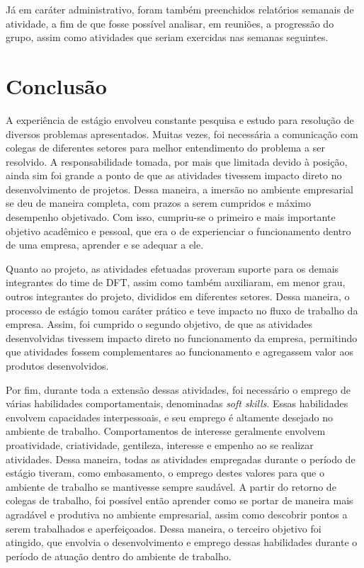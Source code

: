 \documentclass[
	12pt,				%
    oneside,			%
	a4paper,			%
	english,			%
	french,				%
	spanish,			%
	brazil				%
	]{abntex2}
\begin{document}
Já em caráter administrativo, foram também preenchidos relatórios semanais de atividade, a fim de que fosse possível analisar, em reuniões, a progressão do grupo, assim como atividades que seriam exercidas nas semanas seguintes. 

\chapter{Conclusão}

A experiência de estágio envolveu constante pesquisa e estudo para resolução de diversos problemas apresentados. Muitas vezes, foi necessária a comunicação com colegas de diferentes setores para melhor entendimento do problema a ser resolvido. A responsabilidade tomada, por mais que limitada devido à posição, ainda sim foi grande a ponto de que as atividades tivessem impacto direto no desenvolvimento de projetos. Dessa maneira, a imersão no ambiente empresarial se deu de maneira completa, com prazos a serem cumpridos e máximo desempenho objetivado. Com isso, cumpriu-se o primeiro e mais importante objetivo acadêmico e pessoal, que era o de experienciar o funcionamento dentro de uma empresa, aprender e se adequar a ele.

Quanto ao projeto, as atividades efetuadas proveram suporte para os demais integrantes do time de DFT, assim como também auxiliaram, em menor grau, outros integrantes do projeto, divididos em diferentes setores. Dessa maneira, o processo de estágio tomou caráter prático e teve impacto no fluxo de trabalho da empresa. Assim, foi cumprido o segundo objetivo, de que as atividades desenvolvidas tivessem impacto direto no funcionamento da empresa, permitindo que atividades fossem complementares ao funcionamento e agregassem valor aos produtos desenvolvidos.

Por fim, durante toda a extensão dessas atividades, foi necessário o emprego de várias habilidades comportamentais, denominadas \textit{soft skills}. Essas habilidades envolvem capacidades interpessoais, e seu emprego é altamente desejado no ambiente de trabalho. Comportamentos de interesse geralmente envolvem proatividade, criatividade, gentileza, interesse e empenho ao se realizar atividades. Dessa maneira, todas as atividades empregadas durante o período de estágio tiveram, como embasamento, o emprego destes valores para que o ambiente de trabalho se mantivesse sempre saudável. A partir do retorno de colegas de trabalho, foi possível então aprender como se portar de maneira mais agradável e produtiva no ambiente empresarial, assim como descobrir pontos a serem trabalhados e aperfeiçoados. Dessa maneira, o terceiro objetivo foi atingido, que envolvia o desenvolvimento e emprego dessas habilidades durante o período de atuação dentro do ambiente de trabalho.
\end{document}
